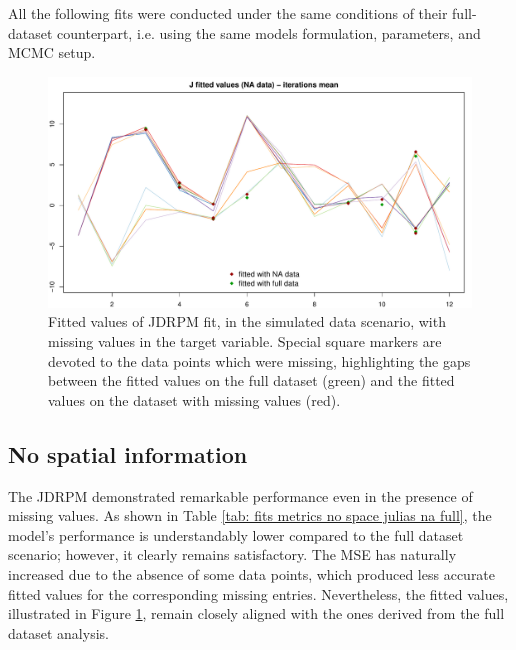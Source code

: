 \documentclass[12pt,	%
	a4paper,		%
	twoside,		%
	openright,		%
	titlepage,%
	]{book}
\theoremstyle{definition}
\begin{document}
All the following fits were conducted under the same conditions of their full-dataset counterpart, i.e. using the same models formulation, parameters, and MCMC setup.

\begin{figure}[!ht]
    \centering
    \includegraphics[width=1\linewidth]{Testing/NA data/no space NA/J_mean_prediction.pdf}
    \caption[Fitted values of JDRPM, simulated data scenario, dataset with missing values]{Fitted values of JDRPM fit, in the simulated data scenario, with missing values in the target variable. Special square markers are devoted to the data points which were missing, highlighting the gaps between the fitted values on the full dataset (green) and the fitted values on the dataset with missing values (red).}
    \label{fig: target values estimates no space NA}
\end{figure}

\subsection{No spatial information}
\label{No spatial information}

The JDRPM demonstrated remarkable performance even in the presence of missing values. As shown in Table \ref{tab: fits metrics no space julias na full}, the model's performance is understandably lower compared to the full dataset scenario; however, it clearly remains satisfactory. The MSE has naturally increased due to the absence of some data points, which produced less accurate fitted values for the corresponding missing entries. Nevertheless, the fitted values, illustrated in Figure \ref{fig: target values estimates no space NA}, remain closely aligned with the ones derived from the full dataset analysis.
\end{document}

